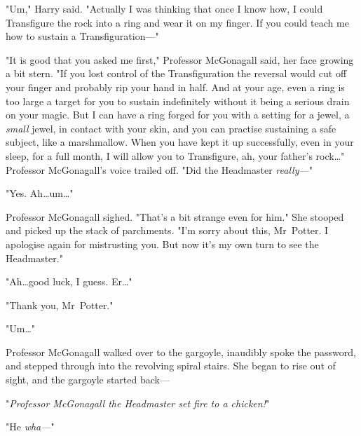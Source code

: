 "Um," Harry said. "Actually I was thinking that once I know how, I could
Transfigure the rock into a ring and wear it on my finger. If you could teach
me how to sustain a Transfiguration—"

"It is good that you asked me first," Professor McGonagall said, her face
growing a bit stern. "If you lost control of the Transfiguration the reversal
would cut off your finger and probably rip your hand in half. And at your age,
even a ring is too large a target for you to sustain indefinitely without it
being a serious drain on your magic. But I can have a ring forged for you with
a setting for a jewel, a \emph{small} jewel, in contact with your skin, and you
can practise sustaining a safe subject, like a marshmallow. When you have kept
it up successfully, even in your sleep, for a full month, I will allow you to
Transfigure, ah, your father’s rock…" Professor McGonagall’s voice
trailed off. "Did the Headmaster \emph{really—}"

"Yes. Ah…um…"

Professor McGonagall sighed. "That’s a bit strange even for him." She stooped
and picked up the stack of parchments. "I’m sorry about this, Mr~Potter. I
apologise again for mistrusting you. But now it’s my own turn to see the
Headmaster."

"Ah…good luck, I guess. Er…"

"Thank you, Mr~Potter."

"Um…"

Professor McGonagall walked over to the gargoyle, inaudibly spoke the password,
and stepped through into the revolving spiral stairs. She began to rise out of
sight, and the gargoyle started back—

"\emph{Professor McGonagall the Headmaster set fire to a chicken!}"

"He \emph{wha—}"
